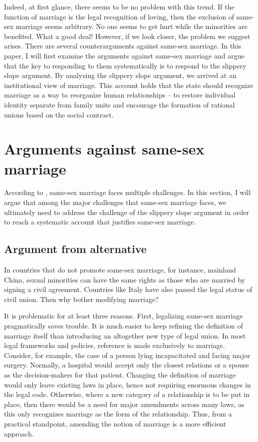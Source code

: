 \documentclass[man,floatsintext]{apa7}
\begin{document}
Indeed, at first glance, there seems to be no problem with this trend. If the function of marriage is the legal recognition of loving, then the exclusion of same-sex marriage seems arbitrary. No one seems to get hurt while the minorities are benefited. What a good deal! However, if we look closer, the problem we suggest arises. There are several counterarguments against same-sex marriage. In this paper, I will first examine the arguments against same-sex marriage and argue that the key to responding to them systematically is to respond to the slippery slope argument. By analyzing the slippery slope argument, we arrived at an institutional view of marriage. This account holds that the state should recognize marriage as a way to reorganize human relationships -- to restore individual identity separate from family units and encourage the formation of rational unions based on the social contract.

\section{Arguments against same-sex marriage}

According to \textcite{brakeMarriageDomesticPartnership2023}, same-sex marriage faces multiple challenges. In this section, I will argue that among the major challenges that same-sex marriage faces,  we ultimately need to address the challenge of the slippery slope argument in order to reach a systematic account that justifies same-sex marriage.

\subsection{Argument from alternative}
\label{alternative}

In countries that do not promote same-sex marriage, for instance, mainland China, sexual minorities can have the same rights as those who are married by signing a civil agreement. Countries like Italy have also passed the legal status of civil union.\autocite{povoledoItalyApprovesSameSex2016} Then why bother modifying marriage? 

It is problematic for at least three reasons. First, legalizing same-sex marriage pragmatically saves trouble. It is much easier to keep refining the definition of marriage itself than introducing an altogether new type of legal union. In most legal frameworks and policies, reference is made exclusively to marriage. Consider, for example, the case of a person lying incapacitated and facing major surgery. Normally, a hospital would accept only the closest relations or a spouse as the decision-makers for that patient. Changing the definition of marriage would only leave existing laws in place, hence not requiring enormous changes in the legal code. Otherwise, where a new category of a relationship is to be put in place, then there would be a need for major amendments across many laws, as this only recognizes marriage as the form of the relationship. Thus, from a practical standpoint, amending the notion of marriage is a more efficient approach. 
\end{document}

